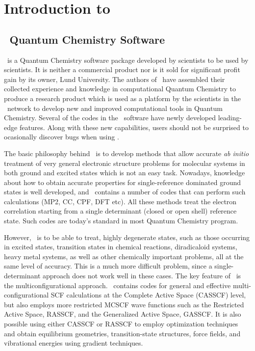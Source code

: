 
\chapter{Introduction to \molcas}
\section{\molcas\, Quantum Chemistry Software}
\molcas\ is a Quantum Chemistry software package developed by scientists to be used by 
scientists. It is neither a commercial product nor is it sold for significant profit gain
by its owner, Lund University. The authors 
of \molcas\ have assembled their collected experience and knowledge in 
computational Quantum Chemistry to produce a research product which is used 
as a platform by the scientists in the \molcas\ network to 
develop new and improved computational tools in Quantum Chemistry. Several of 
the codes in the \molcas\ software have newly developed leading-edge features. Along with these new
capabilities, users should not be surprised to ocasionally discover bugs when using  \molcas.

The basic philosophy behind \molcas\ is to develop methods that allow 
accurate {\em ab initio} treatment of very general electronic structure problems
for molecular systems in both ground and excited states which is not an easy 
task. Nowadays, knowledge about how to obtain accurate properties for single-reference 
dominated ground states is well developed, and \molcas\ contains 
a number of codes that can perform such calculations (MP2, CC, CPF, DFT etc). 
All these methods treat the electron correlation starting from a single 
determinant (closed or open shell) reference state. Such codes are today's 
standard in most Quantum Chemistry program.

However, \molcas\ is to be able to treat, 
highly degenerate states, such as those occurring in 
excited states, transition states in chemical reactions, diradicaloid systems, heavy metal systems, 
as well as other chemically important problems, all at the same level of accuracy.
This is a much more difficult problem,
since a single-determinant approach does not work well in these cases. The key 
feature of \molcas\ is the multiconfigurational approach. \molcas\ contains 
codes for general and effective multi-configurational SCF calculations at the 
Complete Active Space (CASSCF) level, but also employs more restricted MCSCF 
wave functions such as the Restricted Active Space, RASSCF, and the Generalized Active Space, GASSCF. 
It is also possible using either CASSCF or RASSCF to 
employ optimization techniques and obtain equilibrium geometries, transition-state structures,
force fields, and vibrational energies using gradient techniques.


